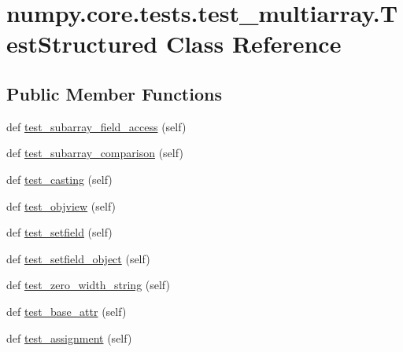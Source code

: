 \hypertarget{classnumpy_1_1core_1_1tests_1_1test__multiarray_1_1TestStructured}{}\section{numpy.\+core.\+tests.\+test\+\_\+multiarray.\+Test\+Structured Class Reference}
\label{classnumpy_1_1core_1_1tests_1_1test__multiarray_1_1TestStructured}
\subsection*{Public Member Functions}
\begin{DoxyCompactItemize}
\item 
def \hyperlink{classnumpy_1_1core_1_1tests_1_1test__multiarray_1_1TestStructured_afb44688f75d5532f20dbb3a38cd2e05d}{test\+\_\+subarray\+\_\+field\+\_\+access} (self)
\item 
def \hyperlink{classnumpy_1_1core_1_1tests_1_1test__multiarray_1_1TestStructured_a953492c6c60262440c424c37a8afbed7}{test\+\_\+subarray\+\_\+comparison} (self)
\item 
def \hyperlink{classnumpy_1_1core_1_1tests_1_1test__multiarray_1_1TestStructured_a07be60bbe1589e272760e76ce5751544}{test\+\_\+casting} (self)
\item 
def \hyperlink{classnumpy_1_1core_1_1tests_1_1test__multiarray_1_1TestStructured_ac56c94e7753058020b63449c5d2e8ecb}{test\+\_\+objview} (self)
\item 
def \hyperlink{classnumpy_1_1core_1_1tests_1_1test__multiarray_1_1TestStructured_a6031fa3fd7b34c758b8074ec93908ad4}{test\+\_\+setfield} (self)
\item 
def \hyperlink{classnumpy_1_1core_1_1tests_1_1test__multiarray_1_1TestStructured_a8a615f6e340da94f4ea27a4793bfdb6e}{test\+\_\+setfield\+\_\+object} (self)
\item 
def \hyperlink{classnumpy_1_1core_1_1tests_1_1test__multiarray_1_1TestStructured_a1f60e8227229cb1035068af8cf1acc3c}{test\+\_\+zero\+\_\+width\+\_\+string} (self)
\item 
def \hyperlink{classnumpy_1_1core_1_1tests_1_1test__multiarray_1_1TestStructured_affa9de00af48d14d4fa0736f7ddb543f}{test\+\_\+base\+\_\+attr} (self)
\item 
def \hyperlink{classnumpy_1_1core_1_1tests_1_1test__multiarray_1_1TestStructured_a340e8380d2671b4ef21739bc244ee8f8}{test\+\_\+assignment} (self)
\item 

\end{DoxyCompactItemize}
